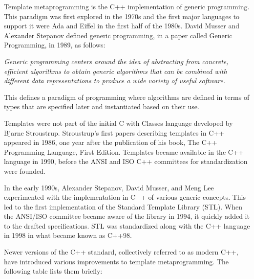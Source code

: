 Template metaprogramming is the C++ implementation of generic programming. This paradigm was first explored in the 1970s and the first major languages to support it were Ada and Eiffel in the first half of the 1980s. David Musser and Alexander Stepanov defined generic programming, in a paper called Generic Programming, in 1989, as follows:

\begin{center}
\textit{
Generic programming centers around the idea of abstracting from concrete, efficient algorithms to obtain generic algorithms that can be combined with different data representations to produce a wide variety of useful software.
}
\end{center}

This defines a paradigm of programming where algorithms are defined in terms of types that are specified later and instantiated based on their use.

Templates were not part of the initial C with Classes language developed by Bjarne Stroustrup. Stroustrup's first papers describing templates in C++ appeared in 1986, one year after the publication of his book, The C++ Programming Language, First Edition. Templates became available in the C++ language in 1990, before the ANSI and ISO C++ committees for standardization were founded.

In the early 1990s, Alexander Stepanov, David Musser, and Meng Lee experimented with the implementation in C++ of various generic concepts. This led to the first implementation of the Standard Template Library (STL). When the ANSI/ISO committee became aware of the library in 1994, it quickly added it to the drafted specifications. STL was standardized along with the C++ language in 1998 in what became known as C++98.

Newer versions of the C++ standard, collectively referred to as modern C++, have introduced various improvements to template metaprogramming. The following table lists them briefly:

